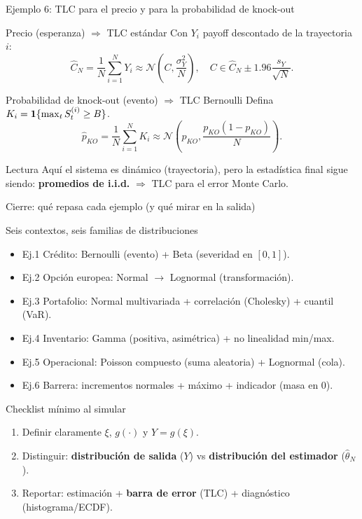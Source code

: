 \documentclass[aspectratio=1610, 9pt]{beamer}
\begin{document}
\begin{frame}{Ejemplo 6: TLC para el precio y para la probabilidad de knock-out}
\small
\begin{block}{Precio (esperanza) $\Rightarrow$ TLC estándar}
Con $Y_i$ payoff descontado de la trayectoria $i$:
\[
\widehat{C}_N=\frac{1}{N}\sum_{i=1}^N Y_i
\approx \mathcal{N}\!\left(C,\frac{\sigma_Y^2}{N}\right),
\quad
C\in \widehat{C}_N\pm 1.96\frac{s_Y}{\sqrt{N}}.
\]
\end{block}

\begin{block}{Probabilidad de knock-out (evento) $\Rightarrow$ TLC Bernoulli}
Defina $K_i=\mathbf{1}\{\max_t S_t^{(i)}\ge B\}$.
\[
\widehat{p}_{KO}=\frac{1}{N}\sum_{i=1}^N K_i
\approx \mathcal{N}\!\left(p_{KO},\frac{p_{KO}(1-p_{KO})}{N}\right).
\]
\end{block}

\begin{alertblock}{Lectura}
Aquí el sistema es dinámico (trayectoria), pero la estadística final sigue siendo:
\textbf{promedios de i.i.d.} $\Rightarrow$ TLC para el error Monte Carlo.
\end{alertblock}
\end{frame}

\begin{frame}{Cierre: qué repasa cada ejemplo (y qué mirar en la salida)}
\small
\begin{block}{Seis contextos, seis familias de distribuciones}
\begin{itemize}
\item Ej.1 Crédito: Bernoulli (evento) + Beta (severidad en $[0,1]$).
\item Ej.2 Opción europea: Normal $\to$ Lognormal (transformación).
\item Ej.3 Portafolio: Normal multivariada + correlación (Cholesky) + cuantil (VaR).
\item Ej.4 Inventario: Gamma (positiva, asimétrica) + no linealidad min/max.
\item Ej.5 Operacional: Poisson compuesto (suma aleatoria) + Lognormal (cola).
\item Ej.6 Barrera: incrementos normales + máximo + indicador (masa en 0).
\end{itemize}
\end{block}

\begin{block}{Checklist mínimo al simular}
\begin{enumerate}
\item Definir claramente $\xi$, $g(\cdot)$ y $Y=g(\xi)$.
\item Distinguir: \textbf{distribución de salida} ($Y$) vs \textbf{distribución del estimador} ($\widehat{\theta}_N$).
\item Reportar: estimación + \textbf{barra de error} (TLC) + diagnóstico (histograma/ECDF).
\end{enumerate}
\end{block}
\end{frame}
\end{document}
